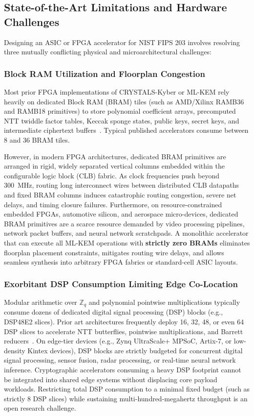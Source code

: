 \subsection{State-of-the-Art Limitations and Hardware Challenges}
\label{sec:intro_challenges}
Designing an ASIC or FPGA accelerator for NIST FIPS 203 involves resolving three mutually conflicting physical and microarchitectural challenges:

\subsubsection{Block RAM Utilization and Floorplan Congestion}
Most prior FPGA implementations of CRYSTALS-Kyber or ML-KEM rely heavily on dedicated Block RAM (BRAM) tiles (such as AMD/Xilinx RAMB36 and RAMB18 primitives) to store polynomial coefficient arrays, precomputed NTT twiddle factor tables, Keccak sponge states, public keys, secret keys, and intermediate ciphertext buffers~\cite{xing2023tcas1, imran2022tvlsi, banerjee2021sapphire}. Typical published accelerators consume between 8 and 36 BRAM tiles.

However, in modern FPGA architectures, dedicated BRAM primitives are arranged in rigid, widely separated vertical columns embedded within the configurable logic block (CLB) fabric. As clock frequencies push beyond 300~MHz, routing long interconnect wires between distributed CLB datapaths and fixed BRAM columns induces catastrophic routing congestion, severe net delays, and timing closure failures. Furthermore, on resource-constrained embedded FPGAs, automotive silicon, and aerospace micro-devices, dedicated BRAM primitives are a scarce resource demanded by video processing pipelines, network packet buffers, and neural network scratchpads. A monolithic accelerator that can execute all ML-KEM operations with \textbf{strictly zero BRAMs} eliminates floorplan placement constraints, mitigates routing wire delays, and allows seamless synthesis into arbitrary FPGA fabrics or standard-cell ASIC layouts.

\subsubsection{Exorbitant DSP Consumption Limiting Edge Co-Location}
Modular arithmetic over $\mathbb{Z}_q$ and polynomial pointwise multiplications typically consume dozens of dedicated digital signal processing (DSP) blocks (e.g., DSP48E2 slices). Prior art architectures frequently deploy 16, 32, 48, or even 64 DSP slices to accelerate NTT butterflies, pointwise multiplications, and Barrett reducers~\cite{xing2023tcas1, imran2022tvlsi}. On edge-tier devices (e.g., Zynq UltraScale+ MPSoC, Artix-7, or low-density Kintex devices), DSP blocks are strictly budgeted for concurrent digital signal processing, sensor fusion, radar processing, or real-time neural network inference. Cryptographic accelerators consuming a heavy DSP footprint cannot be integrated into shared edge systems without displacing core payload workloads. Restricting total DSP consumption to a minimal fixed budget (such as strictly 8 DSP slices) while sustaining multi-hundred-megahertz throughput is an open research challenge.

